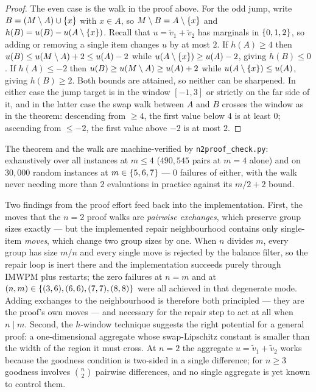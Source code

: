 \begin{proof}
The even case is the walk in the proof above. For the odd jump, write $B =
(M \setminus A) \cup \left\{x\right\}$ with $x \in A$, so $M \setminus B =
A \setminus \left\{x\right\}$ and $h(B) = u(B) - u(A \setminus \left\{x\right\})$. Recall that
$u = \tilde{v}_1 + \tilde{v}_2$ has marginals in $\left\{0,1,2\right\}$, so adding or
removing a single item changes $u$ by at most $2$. If $h(A) \ge 4$ then
$u(B) \le u(M \setminus A) + 2 \le u(A) - 2$ while $u(A \setminus
\left\{x\right\}) \ge u(A) - 2$, giving $h(B) \le 0$. If $h(A) \le -2$ then
$u(B) \ge u(M \setminus A) \ge u(A) + 2$ while $u(A \setminus \left\{x\right\})
\le u(A)$, giving $h(B) \ge 2$. Both bounds are attained, so neither can be
sharpened. In either case the jump target is in the window $[-1,3]$ or
strictly on the far side of it, and in the latter case the swap walk between
$A$ and $B$ crosses the window as in the theorem: descending from $\ge 4$, the
first value below $4$ is at least $0$; ascending from $\le -2$, the first value
above $-2$ is at most $2$.
\end{proof}

The theorem and the walk are machine-verified by \texttt{n2proof\_check.py}:
exhaustively over all instances at $m \le 4$ ($490{,}545$ pairs at $m = 4$
alone) and on $30{,}000$ random instances at $m \in \left\{5,6,7\right\}$ --- $0$
failures of either, with the walk never needing more than $2$ evaluations in
practice against its $m/2 + 2$ bound.

\begin{remark}
\label{rem:proof-driven-refinement}
Two findings from the proof effort feed back into the implementation. First,
the moves that the $n = 2$ proof walks are \emph{pairwise exchanges}, which
preserve group sizes exactly --- but the implemented repair neighbourhood
contains only single-item \emph{moves}, which change two group sizes by one.
When $n$ divides $m$, every group has size $m/n$ and every single move is
rejected by the balance filter, so the repair loop is inert there and the
implementation succeeds purely through IMWPM plus restarts; the zero failures
at $n = m$ and at $(n,m) \in \left\{(3,6), (6,6), (7,7), (8,8)\right\}$ were all
achieved in that degenerate mode. Adding exchanges to the neighbourhood is
therefore both principled --- they are the proof's own moves --- and necessary
for the repair step to act at all when $n \mid m$. Second, the $h$-window
technique suggests the right potential for a general proof: a
one-dimensional aggregate whose swap-Lipschitz constant is smaller than the
width of the region it must cross. At $n = 2$ the aggregate $u = \tilde{v}_1 +
\tilde{v}_2$ works because the goodness condition is two-sided in a single
difference; for $n \ge 3$ goodness involves $\binom{n}{2}$ pairwise
differences, and no single aggregate is yet known to control them.
\end{remark}

